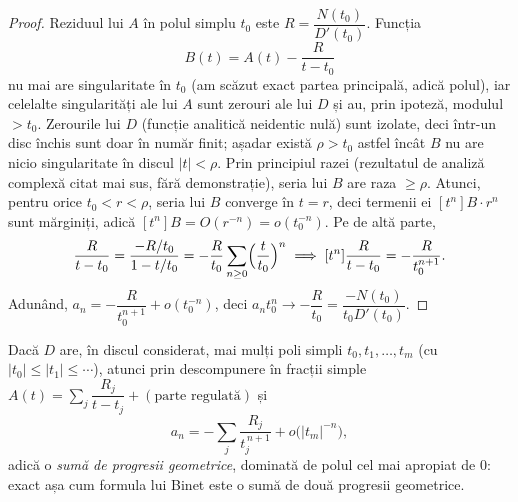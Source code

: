\begin{proof}
Reziduul lui $A$ în polul simplu $t_0$ este $R=\dfrac{N(t_0)}{D'(t_0)}$. Funcția
\[
B(t)=A(t)-\frac{R}{t-t_0}
\]
nu mai are singularitate în $t_0$ (am scăzut exact partea principală, adică polul), iar celelalte singularități ale lui $A$ sunt zerouri ale lui $D$ și au, prin ipoteză, modulul $>t_0$. Zerourile lui $D$ (funcție analitică neidentic nulă) sunt izolate, deci într-un disc închis sunt doar în număr finit; așadar există $\rho>t_0$ astfel încât $B$ nu are nicio singularitate în discul $|t|<\rho$. Prin principiul razei (rezultatul de analiză complexă citat mai sus, fără demonstrație), seria lui $B$ are raza $\ge\rho$. Atunci, pentru orice $t_0<r<\rho$, seria lui $B$ converge în $t=r$, deci termenii ei $[t^n]B\cdot r^n$ sunt mărginiți, adică $[t^n]B=O(r^{-n})=o(t_0^{-n})$. Pe de altă parte,
\[
\frac{R}{t-t_0}=\frac{-R/t_0}{1-t/t_0}=-\frac{R}{t_0}\sum_{n\ge0}\Bigl(\frac{t}{t_0}\Bigr)^n
\implies [t^n]\frac{R}{t-t_0}=-\frac{R}{t_0^{n+1}}.
\]
Adunând, $a_n=-\dfrac{R}{t_0^{n+1}}+o(t_0^{-n})$, deci $a_nt_0^n\to-\dfrac{R}{t_0}=\dfrac{-N(t_0)}{t_0D'(t_0)}$.
\end{proof}

\begin{corolar}
Dacă $D$ are, în discul considerat, mai mulți poli simpli $t_0,t_1,\ldots,t_m$ (cu $|t_0|\le|t_1|\le\cdots$), atunci prin descompunere în fracții simple $A(t)=\sum_j\dfrac{R_j}{t-t_j}+(\text{parte regulată})$ și
\[
a_n=-\sum_j\frac{R_j}{t_j^{\,n+1}}+o\bigl(|t_m|^{-n}\bigr),
\]
adică o \emph{sumă de progresii geometrice}, dominată de polul cel mai apropiat de $0$: exact așa cum formula lui Binet este o sumă de două progresii geometrice.
\end{corolar}

